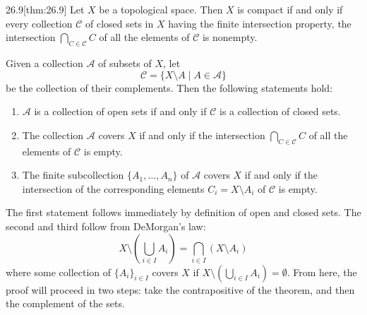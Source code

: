 \begin{thmBox}{26.9}[thm:26.9]
    Let \( X \) be a topological space.
    Then \( X \) is compact if and only if every collection \( \mathcal{C} \) of
    closed sets in \( X \) having the finite intersection property, the 
    intersection \( \bigcap_{ C \in \mathcal{C} } C \) of all the elements of 
    \( \mathcal{C} \) is nonempty.

    \baseRule

    \begin{proofBox}
        Given a collection \( \mathcal{A} \) of subsets of \( X \), let
        \begin{equation*}
            \mathcal{C}
            =
            \{ X \setminus A \mid A \in \mathcal{A} \} 
        \end{equation*}
        be the collection of their complements.
        Then the following statements hold:
        \begin{enumerate}
            \item \( \mathcal{A} \) is a collection of open sets if and only if
                \( \mathcal{C} \) is a collection of closed sets.
            \item The collection \( \mathcal{A} \) covers \( X \) if and only if
                the intersection \( \bigcap_{ C \in \mathcal{C} } C \) of all 
                the elements of \( \mathcal{C} \) is empty.
            \item The finite subcollection 
            \( \{ A_{ 1 } , \ldots , A_{ n } \} \) of \( \mathcal{A} \) covers
            \( X \) if and only if the intersection of the corresponding 
            elements \( C_{ i } = X \setminus A_{ i } \) of \( \mathcal{C} \)
            is empty.
        \end{enumerate}
        The first statement follows immediately by definition of open and closed
        sets.
        The second and third follow from DeMorgan's law:
        \begin{equation*}
            X \setminus \left( \bigcup_{ i \in I } A_{ i } \right)
            =
            \bigcap_{ i \in I } ( X \setminus A_{ i } )
        \end{equation*}
        where some collection of \( \{ A_{ i } \}_{ i \in I } \) covers \( X \)
        if \( X \setminus \left( \bigcup_{ i \in I } A_{ i } \right) 
        = \emptyset \).
        From here, the proof will proceed in two steps: take the contrapositive
        of the theorem, and then the complement of the sets.


\end{proofBox}
\end{thmBox}
